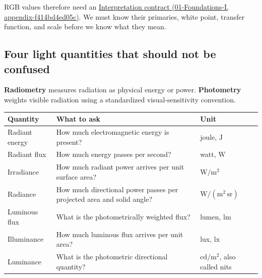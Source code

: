 RGB values therefore need an \href{../01-Foundations-I/main.pdf\#nameddest=appendix-f414bd4ed05c}{Interpretation contract (01-Foundations-I, appendix-f414bd4ed05c)}. We must know their primaries, white point, transfer function, and scale before we know what they mean.

\subsection{Four light quantities that should not be confused}\label{04-visual-computing-ii-ch043-four-light-quantities-that-should-not-be-confused}

\textbf{Radiometry} measures radiation as physical energy or power. \textbf{Photometry} weights visible radiation using a standardized visual-sensitivity convention.

{\def\LTcaptype{none} %
\begin{longtable}[]{@{}
  >{\raggedright\arraybackslash}p{}
  >{\raggedright\arraybackslash}p{}
  >{\raggedright\arraybackslash}p{}@{}}
\toprule\noalign{}
\begin{minipage}[b]{\linewidth}\raggedright
Quantity
\end{minipage} & \begin{minipage}[b]{\linewidth}\raggedright
What to ask
\end{minipage} & \begin{minipage}[b]{\linewidth}\raggedright
Unit
\end{minipage} \\
\midrule\noalign{}
\endhead
\bottomrule\noalign{}
\endlastfoot
Radiant energy & How much electromagnetic energy is present? & joule, \(\mathrm{J}\) \\
Radiant flux & How much energy passes per second? & watt, \(\mathrm{W}\) \\
Irradiance & How much radiant power arrives per unit surface area? & \(\mathrm{W/m^2}\) \\
Radiance & How much directional power passes per projected area and solid angle? & \(\mathrm{W/(m^2\,sr)}\) \\
Luminous flux & What is the photometrically weighted flux? & lumen, \(\mathrm{lm}\) \\
Illuminance & How much luminous flux arrives per unit area? & lux, \(\mathrm{lx}\) \\
Luminance & What is the photometric directional quantity? & \(\mathrm{cd/m^2}\), also called nits \\
\end{longtable}
}

